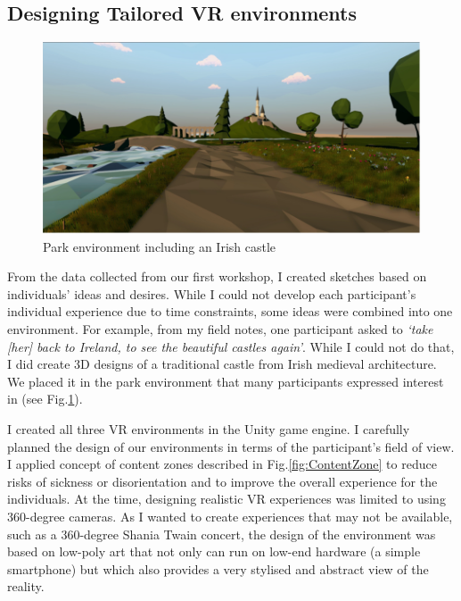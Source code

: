 \subsection{Designing Tailored VR environments}
\label{S1:VREnvrionments}

\begin{figure}
\centering
\includegraphics[width=.8\linewidth]{Images/ChapterFour/IrishCastlVR.png}
\caption{Park environment including an Irish castle}
\label{fig:IrishCastle}
\end{figure}

From the data collected from our first workshop, I created sketches based on individuals' ideas and desires. While I could not develop each participant's individual experience due to time constraints, some ideas were combined into one environment. For example, from my field notes, one participant asked to \textit{`take [her] back to Ireland, to see the beautiful castles again’}. While I could not do that, I did create 3D designs of a traditional castle from Irish medieval architecture. We placed it in the park environment that many participants expressed interest in (see Fig.\ref{fig:IrishCastle}).

I created all three VR environments in the Unity game engine. I carefully planned the design of our environments in terms of the participant's field of view. I applied \cite{alger_visual_2015} concept of content zones described in Fig.\ref{fig:ContentZone} to reduce risks of sickness or disorientation and to improve the overall experience for the individuals. At the time, designing realistic VR experiences was limited to using 360-degree cameras. As I wanted to create experiences that may not be available, such as a 360-degree Shania Twain concert, the design of the environment was based on low-poly art that not only can run on low-end hardware (a simple smartphone) but which also provides a very stylised and abstract view of the reality.

